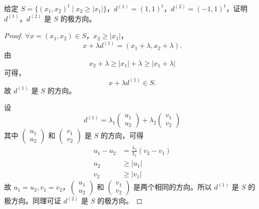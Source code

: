 \begin{example}
    给定 $S = \{(x_1, x_2)^t \mid x_2 \ge |x_1|\}$，$d^{(1)} = (1, 1)^t$，$d^{(2)} = (-1, 1)^t$，证明 $d^{(1)}$，$d^{(2)}$ 是 $S$ 的极方向。

    \begin{proof}
        $\forall x = (x_1, x_2) \in S$，$x_2 \ge |x_1|$，
        \[x + \lambda d^{(1)} = (x_1 + \lambda, x_2 + \lambda).\]
        由 
        \[x_2 + \lambda \ge |x_1| + \lambda \ge |x_1 + \lambda|\]
        可得，
        \[x + \lambda d^{(1)} \in S.\]
        故 $d^{(1)}$ 是 $S$ 的方向。

        设
        \[d^{(1)} = \lambda_1\begin{pmatrix}
            u_1\\
            u_2
        \end{pmatrix} + \lambda_2\begin{pmatrix}
            v_1 \\
            v_2
        \end{pmatrix}\]
        其中 $\begin{pmatrix}
            u_1 \\
            u_2
        \end{pmatrix}$ 和 $\begin{pmatrix}
            v_1 \\
            v_2
        \end{pmatrix}$ 是 $S$ 的方向，可得 
        \begin{align*}
            u_1 - u_2 &= \frac{\lambda_2}{\lambda_1}(v_2 - v_1)\\
            u_2 &\ge |u_1|\\
            v_2 &\ge |v_1|
        \end{align*}
        故 $u_1 = u_2, v_1 = v_2$，$\begin{pmatrix}
            u_1 \\
            u_2
        \end{pmatrix}$ 和 $\begin{pmatrix}
            v_1 \\
            v_2
        \end{pmatrix}$ 是两个相同的方向。所以 $d^{(1)}$ 是 $S$ 的极方向。同理可证 $d^{(2)}$ 是 $S$ 的极方向。
    \end{proof}
\end{example}

